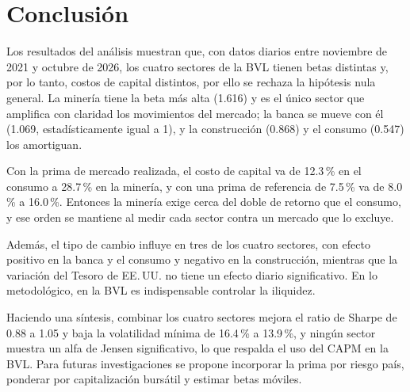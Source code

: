 \documentclass[12pt]{article}
\begin{document}
\section{Conclusión}
Los resultados del análisis muestran que, con datos diarios entre noviembre de 2021 y octubre de 2026, los cuatro sectores de la BVL tienen betas distintas y, por lo tanto, costos de capital distintos, por ello se rechaza la hipótesis nula general. La minería tiene la beta más alta (1.616) y es el único sector que amplifica con claridad los movimientos del mercado; la banca se mueve con él (1.069, estadísticamente igual a 1), y la construcción (0.868) y el consumo (0.547) los amortiguan.

Con la prima de mercado realizada, el costo de capital va de 12.3\,\% en el consumo a 28.7\,\% en la minería, y con una prima de referencia de 7.5\,\% va de 8.0\,\% a 16.0\,\%. Entonces la minería exige cerca del doble de retorno que el consumo, y ese orden se mantiene al medir cada sector contra un mercado que lo excluye.

Además, el tipo de cambio influye en tres de los cuatro sectores, con efecto positivo en la banca y el consumo y negativo en la construcción, mientras que la variación del Tesoro de EE.\,UU. no tiene un efecto diario significativo. En lo metodológico, en la BVL es indispensable controlar la iliquidez.

Haciendo una síntesis, combinar los cuatro sectores mejora el ratio de Sharpe de 0.88 a 1.05 y baja la volatilidad mínima de 16.4\,\% a 13.9\,\%, y ningún sector muestra un alfa de Jensen significativo, lo que respalda el uso del CAPM en la BVL. Para futuras investigaciones se propone incorporar la prima por riesgo país, ponderar por capitalización bursátil y estimar betas móviles.

\newpage
\end{document}
